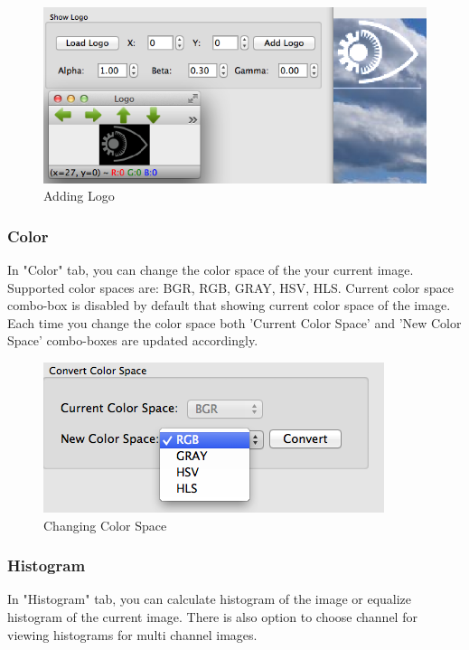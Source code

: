 \documentclass{article}
\begin{document}
\begin{figure}[H]
\begin{center}
\includegraphics[scale=0.7]{toolboxLogo.png}
\caption{Adding Logo}
\end{center}
\end{figure}	


\subsubsection{Color}

In "Color" tab, you can change the color space of the your current image. Supported color spaces are: BGR, RGB, GRAY, HSV, HLS. Current color space combo-box is disabled by default that showing current color space of the image. Each time you change the color space both 'Current Color Space' and 'New Color Space' combo-boxes are updated accordingly.

\begin{figure}[H]
\begin{center}
\includegraphics[scale=0.7]{toolboxColorSpace.png}
\caption{Changing Color Space}
\end{center}
\end{figure}	

\subsubsection{Histogram}

In "Histogram" tab, you can calculate histogram of the image or equalize histogram of the current image. There is also option to choose channel for viewing histograms for multi channel images. 
\end{document}
